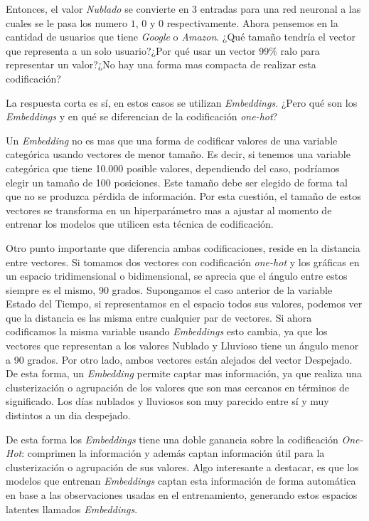\documentclass[11pt,a4paper,twoside]{thesis}
\begin{document}
Entonces, el valor \textit{Nublado} se convierte en 3 entradas para una red
neuronal a las cuales se le pasa los numero $1$, $0$ y $0$ respectivamente.
Ahora pensemos en la cantidad de usuarios que tiene \textit{Google} o
\textit{Amazon}. ¿Qué tamaño tendría el vector que representa a un solo
usuario?¿Por qué usar un vector 99\% ralo para representar un valor?¿No hay una
forma mas compacta de realizar esta codificación?

La respuesta corta es sí, en estos casos se utilizan \textit{Embeddings}. ¿Pero
qué son los \textit{Embeddings} y en qué se diferencian de la codificación
\textit{one-hot}?

Un \textit{Embedding} no es mas que una forma de codificar valores de una
variable categórica usando vectores de menor tamaño. Es decir, si tenemos una
variable categórica que tiene 10.000 posible valores, dependiendo del caso,
podríamos elegir un tamaño de 100 posiciones. Este tamaño debe ser elegido de
forma tal que no se produzca pérdida de información. Por esta cuestión, el
tamaño de estos vectores se transforma en un hiperparámetro mas a ajustar al
momento de entrenar los modelos que utilicen esta técnica de codificación.

Otro punto importante que diferencia ambas codificaciones, reside en la
distancia entre vectores. Si tomamos dos vectores con codificación
\textit{one-hot} y los gráficas en un espacio tridimensional o bidimensional,
se aprecia que el ángulo entre estos siempre es el mismo, 90 grados. Supongamos
el caso anterior de la variable Estado del Tiempo, si representamos en el
espacio todos sus valores, podemos ver que la distancia es las misma entre
cualquier par de vectores. Si ahora codificamos la misma variable usando
\textit{Embeddings} esto cambia, ya que los vectores que representan a los
valores Nublado y Lluvioso tiene un ángulo menor a 90 grados. Por otro lado,
ambos vectores están alejados del vector Despejado. De esta forma, un
\textit{Embedding} permite captar mas información, ya que realiza una
clusterización o agrupación de los valores que son mas cercanos en términos de
significado. Los días nublados y lluviosos son muy parecido entre sí y muy
distintos a un dia despejado.

De esta forma los \textit{Embeddings} tiene una doble ganancia sobre la
codificación \textit{One-Hot}: comprimen la información y además captan
información útil para la clusterización o agrupación de sus valores. Algo
interesante a destacar, es que los modelos que entrenan \textit{Embeddings}
captan esta información de forma automática en base a las observaciones usadas
en el entrenamiento, generando estos espacios latentes llamados
\textit{Embeddings}.
\end{document}
